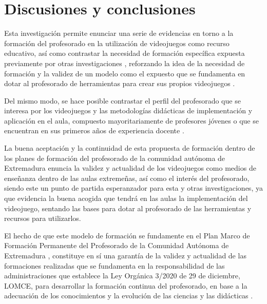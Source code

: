 \documentclass[spanish]{textolivre}
\begin{document}
\section{Discusiones y conclusiones}\label{sec-figuras-tabelas}
Esta investigación permite enunciar una serie de evidencias en torno a la formación del profesorado en la utilización de videojuegos como recurso educativo, así como contrastar la necesidad de formación específica expuesta previamente por otras investigaciones \cite{marin2022videojuegos,gonzalez2023diseno}, reforzando la idea de la necesidad de formación y la validez de un modelo como el expuesto que se fundamenta en dotar al profesorado de herramientas para crear sus propios videojuegos \cite{gonzalez2023diseno}.

Del mismo modo, se hace posible contrastar el perfil del profesorado que se interesa por los videojuegos y las metodologías didácticas de implementación y aplicación en el aula, compuesto mayoritariamente de profesores jóvenes o que se encuentran en sus primeros años de experiencia docente \cite{gerardo2022videojuego}.

La buena aceptación y la continuidad de esta propuesta de formación dentro de los planes de formación del profesorado de la comunidad autónoma de Extremadura enuncia la validez y actualidad de los videojuegos como medios de enseñanza dentro de las aulas extremeñas, así como el interés del profesorado, siendo este un punto de partida esperanzador para esta y otras investigaciones, ya que evidencia la buena acogida que tendrá en las aulas la implementación del videojuego, sentando las bases para dotar al profesorado de las herramientas y recursos para utilizarlos.

El hecho de que este modelo de formación se fundamente en el Plan Marco de Formación Permanente del Profesorado de la Comunidad Autónoma de Extremadura \cite{extremadura2022plan}, constituye en sí una garantía de la validez y actualidad de las formaciones realizadas que se fundamenta en la responsabilidad de las administraciones que establece la Ley Orgánica 3/2020 de 29 de diciembre, LOMCE, para desarrollar la formación continua del profesorado, en base a la adecuación de los conocimientos y la evolución de las ciencias y las didácticas \cite{ministerio2020ley}.
\end{document}
